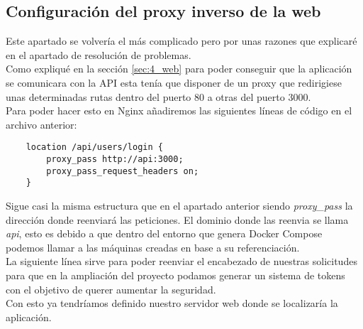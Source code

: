 \subsection{Configuración del proxy inverso de la web}
Este apartado se volvería el más complicado pero por unas razones que explicaré en el apartado de resolución de problemas.
\\Como expliqué en la sección \ref{sec:4_web} para poder conseguir que la aplicación se comunicara con la API esta tenía que disponer de un proxy que redirigiese unas determinadas rutas dentro del puerto 80 a otras del puerto 3000.
\\Para poder hacer esto en Nginx añadiremos las siguientes líneas de código en el archivo anterior:
\begin{verbatim}
    location /api/users/login {
        proxy_pass http://api:3000;
        proxy_pass_request_headers on;
    }
\end{verbatim}
Sigue casi la misma estructura que en el apartado anterior siendo \textit{proxy\_pass} la dirección donde reenviará las peticiones. El dominio donde las reenvia se llama \textit{api}, esto es debido a que dentro del entorno que genera Docker Compose podemos llamar a las máquinas creadas en base a su referenciación.
\\La siguiente línea sirve para poder reenviar el encabezado de nuestras solicitudes para que en la ampliación del proyecto podamos generar un sistema de tokens con el objetivo de querer aumentar la seguridad.
\\Con esto ya tendríamos definido nuestro servidor web donde se localizaría la aplicación.
